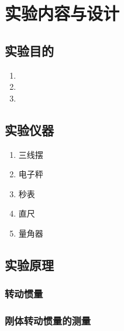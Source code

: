 
\section{实验内容与设计}

\subsection{实验目的}
    \begin{enumerate}
        \item 
        \item 
        \item 
    \end{enumerate}

\subsection{实验仪器}

    \begin{enumerate}
        \item 三线摆
        \item 电子秤
        \item 秒表
        \item 直尺
        \item 量角器
    \end{enumerate}



\subsection{实验原理}
\subsubsection{转动惯量}  

\subsubsection{刚体转动惯量的测量}


   